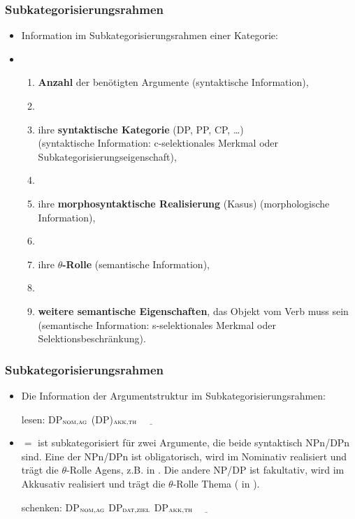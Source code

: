 \begin{frame}
\frametitle{Subkategorisierungsrahmen}

\begin{itemize}
	\item Information im Subkategorisierungsrahmen einer Kategorie:
	\item[]
	\begin{enumerate}
		\item \textbf{Anzahl} der benötigten Argumente (syntaktische Information),
		\item[]
\medskip		
		\item ihre \textbf{syntaktische Kategorie} (DP, PP, CP, \dots )\\
		(syntaktische Information: c-selektionales Merkmal oder Subkategorisierungseigenschaft),
\medskip		
		\item[]
		\item ihre \textbf{morphosyntaktische Realisierung} (\zB Kasus) (morphologische Information),
\medskip		
		\item[]
		\item ihre \textbf{$\theta$-Rolle} (semantische Information),
\medskip		
		\item[]
		\item \textbf{weitere semantische Eigenschaften}, \zB das Objekt vom Verb  muss  sein (semantische Information: s-selektionales Merkmal oder 	Selektionsbeschränkung).
	\end{enumerate}
	
\end{itemize}

\end{frame}


\begin{frame}
\frametitle{Subkategorisierungsrahmen}

\begin{itemize}

	\item Die Information der Argumentstruktur im Subkategorisierungsrahmen:
	
	\ea lesen: DP$_{\textsc{nom,ag}}$ (DP)$_{\textsc{akk,th}}$ $\underline{\qquad}$
	\z
	
	\item[] \textbf{$=$}  ist subkategorisiert für zwei Argumente, die beide syntaktisch NPn/DPn sind. Eine der NPn/DPn ist obligatorisch, wird im Nominativ realisiert und trägt die $\theta$-Rolle Agens, z.B.  in . Die andere NP/DP ist fakultativ, wird im Akkusativ realisiert und trägt die $\theta$-Rolle Thema (\zB {} in ).

	\ea schenken: DP$_{\textsc{nom,ag}}$ DP$_{\textsc{dat,ziel}}$  DP$_{\textsc{akk,th}}$ $\underline{\qquad}$ 
	\z
		
\end{itemize}

\end{frame}


